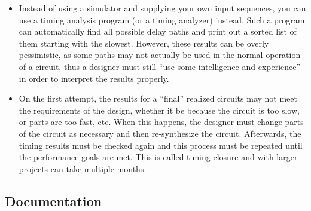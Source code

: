 \documentclass[10pt,a4paper]{article}
\begin{document}
\begin{itemize}
\item Instead of using a simulator and supplying your own input sequences, you can use a timing analysis program (or a timing analyzer) instead. Such a program can automatically find all possible delay paths and print out a sorted list of them starting with the slowest. However, these results can be overly pessimistic, as some paths may not actually be used in the normal operation of a circuit, thus a designer must still ``use some intelligence and experience'' in order to interpret the results properly.
\item On the first attempt, the results for a ``final'' realized circuits may not meet the requirements of the design, whether it be because the circuit is too slow, or parts are too fast, etc. When this happens, the designer must change parts of the circuit as necessary and then re-synthesize the circuit. Afterwards, the timing results must be checked again and this process must be repeated until the performance goals are met. This is called timing closure and with larger projects can take multiple months. 
\end{itemize}
\subsection{Documentation}
\end{document}
